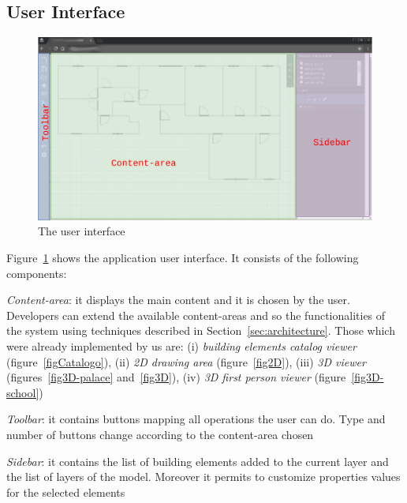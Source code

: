 \subsection{User Interface}\label{ssec:ui}

\begin{figure}[htb]
\centering
\includegraphics[width=\linewidth]{contents/images/mock-interfaccia}
\caption{The user interface}
\label{figInterface}
\end{figure}

Figure~\ref{figInterface} shows the application user interface. It consists of the following components:

\emph{Content-area}: it displays the main content and it is chosen by the user. Developers can extend the available content-areas and so the functionalities of the system using techniques described in Section~\ref{sec:architecture}. Those which were already implemented by us are: (i) \emph{building elements catalog viewer} (figure~\ref{figCatalogo}), (ii) \emph{2D drawing area} (figure~\ref{fig2D}), (iii) \emph{3D viewer} (figures~\ref{fig3D-palace} and~\ref{fig3D}), (iv) \emph{3D first person viewer} (figure~\ref{fig3D-school})

\emph{Toolbar}: it contains buttons mapping all operations the user can do. Type and number of buttons change according to the content-area chosen

\emph{Sidebar}: it contains the list of building elements added to the current layer and the list of layers of the model. Moreover it permits to customize properties values for the selected elements\\

